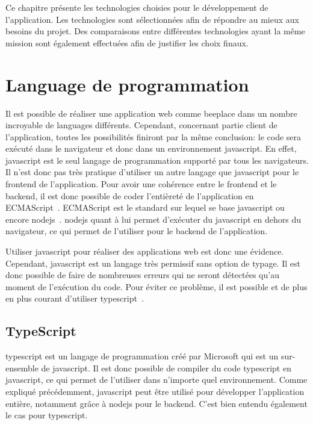 Ce chapitre présente les technologies choisies pour le développement de l'application. Les technologies sont sélectionnées afin de répondre au mieux aux besoins du projet. Des comparaisons entre différentes technologies ayant la même mission sont également effectuées afin de justifier les choix finaux.

\section{Language de programmation}

Il est possible de réaliser une application web comme \gls{beeplace} dans un nombre incroyable de languages différents. Cependant, concernant partie client de l'application, toutes les possibilités finiront par la même conclusion: le code sera exécuté dans le navigateur et donc dans un environnement \gls{javascript}. En effet, \gls{javascript} est le seul langage de programmation supporté par tous les navigateurs. Il n'est donc pas très pratique d'utiliser un autre langage que \gls{javascript} pour le frontend de l'application. Pour avoir une cohérence entre le frontend et le backend, il est donc possible de coder l'entièreté de l'application en ECMAScript~\cite{ecmascript}. ECMAScript est le standard sur lequel se base \gls{javascript} ou encore \gls{nodejs}~\cite{nodejs}. \gls{nodejs} quant à lui permet d'exécuter du \gls{javascript} en dehors du navigateur, ce qui permet de l'utiliser pour le backend de l'application.

Utiliser \gls{javascript} pour réaliser des applications web est donc une évidence. Cependant, \gls{javascript} est un langage très permissif sans option de typage. Il est donc possible de faire de nombreuses erreurs qui ne seront détectées qu'au moment de l'exécution du code. Pour éviter ce problème, il est possible et de plus en plus courant d'utiliser \gls{typescript}~\cite{typescript}.

\subsection{TypeScript}

\gls{typescript} est un langage de programmation créé par Microsoft qui est un sur-ensemble de \gls{javascript}. Il est donc possible de compiler du code \gls{typescript} en \gls{javascript}, ce qui permet de l'utiliser dans n'importe quel environnement. Comme expliqué précédemment, \gls{javascript} peut être utilisé pour développer l'application entière, notamment grâce à \gls{nodejs} pour le backend. C'est bien entendu également le cas pour \gls{typescript}.

